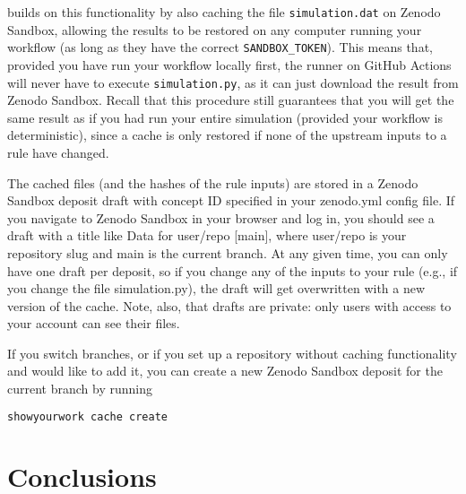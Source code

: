 \documentclass{aa}
\begin{document}
\showyourwork builds on this functionality by also caching the file \texttt{simulation.dat} on Zenodo Sandbox, allowing the results to be restored on any computer running your workflow (as long as they have the correct \texttt{SANDBOX\_TOKEN}).
This means that, provided you have run your workflow locally first, the runner on GitHub Actions will never have to execute \texttt{simulation.py}, as it can just download the result from Zenodo Sandbox.
Recall that this procedure still guarantees that you will get the same result as if you had run your entire simulation (provided your workflow is deterministic), since a cache is only restored if none of the upstream inputs to a rule have changed.

The cached files (and the hashes of the rule inputs) are stored in a Zenodo Sandbox deposit draft with concept ID specified in your zenodo.yml config file. If you navigate to Zenodo Sandbox in your browser and log in, you should see a draft with a title like Data for user/repo [main], where user/repo is your repository slug and main is the current branch. At any given time, you can only have one draft per deposit, so if you change any of the inputs to your rule (e.g., if you change the file simulation.py), the draft will get overwritten with a new version of the cache. Note, also, that drafts are private: only users with access to your account can see their files.

If you switch branches, or if you set up a repository without caching functionality and would like to add it, you can create a new Zenodo Sandbox deposit for the current branch by running

\begin{lstlisting}[language=bash]
showyourwork cache create
\end{lstlisting}

\section{Conclusions}

\begin{acknowledgements}
\end{acknowledgements}

\end{document}
